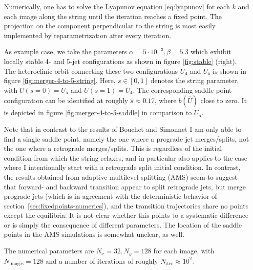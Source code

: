 \documentclass[12pt]{amsart}
\begin{document}
Numerically, one has to solve the Lyapunov equation
\eqref{eq:lyapunov} for each $k$ and each image along the string until
the iteration reaches a fixed point. The projection on the component
perpendicular to the string is most easily implemented by
reparametrization after every iteration.

As example case, we take the parameters $\alpha=5\cdot10^{-3},
\beta=5.3$ which exhibit locally stable 4- and 5-jet configurations as
shown in figure \ref{fig:stable} (right). The heteroclinic orbit
connecting these two configurations $U_4$ and $U_5$ is shown in figure
\ref{fig:merger-4-to-5-string}. Here, $s\in[0,1]$ denotes the string
parameter, with $U(s=0)=U_5$ and $U(s=1)=U_4$. The corresponding
saddle point configuration can be identified at roughly $\hat
s\approx0.17$, where $b(\hat U)$ close to zero. It is depicted in
figure \ref{fig:merger-4-to-5-saddle} in comparison to $U_5$.

Note that in contrast to the results of Bouchet and Simonnet
\cite{bouchet-rolland-simonnet:2019} I am only able to find a single
saddle point, namely the one where a prograde jet merges/splits, not
the one where a retrograde merges/splits. This is regardless of the
initial condition from which the string relaxes, and in particular
also applies to the case where I intentionally start with a retrograde
split initial condition. In contrast, the results obtained from
adaptive multilevel splitting (AMS)
\cite{bouchet-rolland-simonnet:2019} seem to suggest that forward- and
backward transition appear to split retrograde jets, but merge
prograde jets (which is in agreement with the deterministic behavior
of section~\ref{sec:fixedpoints-numerics}), and the transition
trajectories share no points except the equilibria. It is not clear
whether this points to a systematic difference or is simply the
consequence of different parameters. The location of the saddle points
in the AMS simulations is somewhat unclear, as well.

The numerical parameters are $N_x=32, N_y=128$ for each image, with
$N_{\text{images}}=128$ and a number of iterations of roughly
$N_{\text{iter}}\approx10^2$.


 
\end{document}
